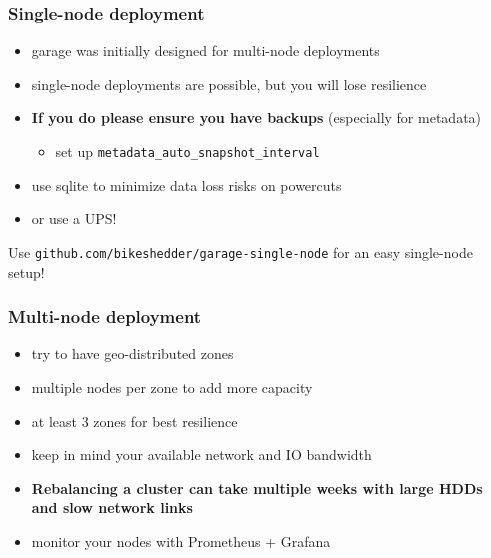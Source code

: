 \documentclass[aspectratio=169]{beamer}
\begin{document}
\begin{frame}
	\frametitle{Single-node deployment}
	\begin{itemize}
		\item garage was initially designed for multi-node deployments
		\item single-node deployments are possible, but you will lose resilience
		\item \textbf{If you do please ensure you have backups} (especially for metadata)
		\begin{itemize}
            \item set up \texttt{metadata\_auto\_snapshot\_interval}
        \end{itemize}
		\item use sqlite to minimize data loss risks on powercuts
		\item or use a UPS!
	\end{itemize}
	\vspace{1em}
	Use \texttt{github.com/bikeshedder/garage-single-node} for an easy single-node setup!
\end{frame}

\begin{frame}
	\frametitle{Multi-node deployment}
	\begin{itemize}
		\item try to have geo-distributed zones
		\item multiple nodes per zone to add more capacity
		\item at least 3 zones for best resilience
		\item keep in mind your available network and IO bandwidth
		\item \textbf{Rebalancing a cluster can take multiple weeks with large HDDs and slow network links}
		\item monitor your nodes with Prometheus + Grafana
	\end{itemize}
\end{frame}
\end{document}
